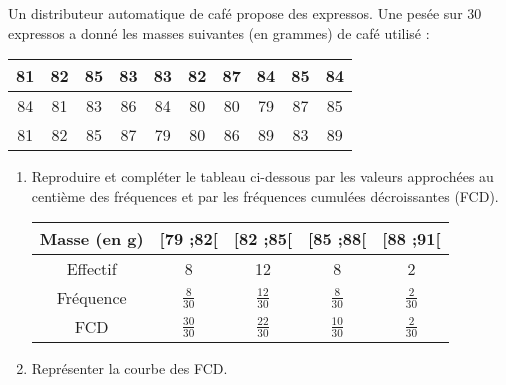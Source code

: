 
Un distributeur automatique de café propose des expressos. Une pesée sur 30 expressos a donné les masses
suivantes (en grammes) de café utilisé :

\begin{tabular}{|c|c|c|c|c|c|c|c|c|c|}
\hline 
81& 82& 85& 83 &83 &82 &87 &84& 85 &84\\ 
\hline 
84 &81 &83 &86 &84 &80& 80& 79 &87& 85\\ 
\hline 
81 &82 &85 &87 &79 &80& 86 &89& 83 &89\\ 
\hline 
\end{tabular} 

\begin{enumerate}
\item Reproduire et compléter le tableau ci-dessous par les valeurs approchées au centième des fréquences
et par les fréquences cumulées décroissantes (FCD).

\begin{tabular}{|c|c|c|c|c|}
\hline 
Masse (en g) &[79 ;82[& [82 ;85[ &[85 ;88[ &[88 ;91[\\
\hline 
Effectif & 8 & 12 & 8 & 2 \\
\hline 
Fréquence& $\frac{8}{30}$& $\frac{12}{30}$ & $\frac{8}{30}$ & $\frac{2}{30}$ \\
\hline 
FCD& $\frac{30}{30}$ & $\frac{22}{30}$ & $\frac{10}{30}$ &$\frac{2}{30}$\\
\hline 
\end{tabular} 

\item  Représenter la courbe des FCD.


\end{enumerate}
